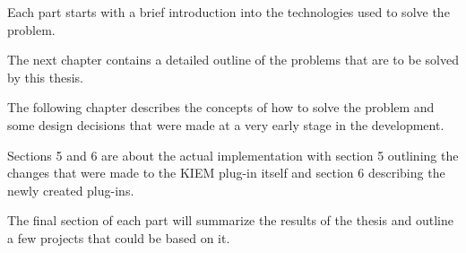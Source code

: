 Each part starts with a brief introduction into the technologies used to solve the problem.

The next chapter contains a detailed outline of the problems that are to be solved by this thesis.

The following chapter describes the concepts of how to solve the problem and some
design decisions that were made at a very early stage in the development.

Sections 5 and 6 are about the actual implementation with section 5 outlining the changes
that were made to the \ac{KIEM} plug-in itself and section 6 describing the newly created plug-ins.

The final section of each part will summarize the results of the thesis and outline
a few projects that could be based on it.



